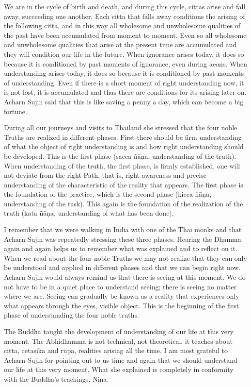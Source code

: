 We are in the cycle of birth and death, and during this cycle, cittas arise and fall away, succeeding one another. Each citta that falls away conditions the arising of the following citta, and in this way all wholesome and unwholesome qualities of the past have been accumulated from moment to moment. Even so all wholesome and unwholesome qualities that arise at the present time are accumulated and they will condition our life in the future. When ignorance arises today, it does so because it is conditioned by past moments of ignorance, even during aeons. When understanding arises today, it does so because it is conditioned by past moments of understanding. Even if there is a short moment of right understanding now, it is not lost, it is accumulated and thus there are conditions for its arising later on. Acharn Sujin said that this is like saving a penny a day, which can become a big fortune.

During all our journeys and visits to Thailand she stressed that the four noble Truths are realized in different phases. First there should be firm understanding of what the object of right understanding is and how right understanding should be developed. This is the first phase (sacca ñāṇa, understanding of the truth). When understanding of the truth, the first phase, is firmly established, one will not deviate from the right Path, that is, right awareness and precise understanding of the characteristic of the reality that appears. The first phase is the foundation of the practice, which is the second phase (kicca ñāṇa, understanding of the task). This again is the foundation of the realization of the truth (kata ñāṇa, understanding of what has been done).

I remember that we were walking in India with one of the Thai monks and that Acharn Sujin was repeatedly stressing these three phases. Hearing the Dhamma again and again helps us to remember what was explained and to reflect on it. When we read about the four noble Truths we may not realize that they can only be understood and applied in different phases and that we can begin right now. Acharn Sujin would always remind us that there is seeing at this moment. We do not have to be in a quiet place to understand seeing; there is seeing no matter where we are. Seeing can gradually be known as a reality that experiences only what appears through the eyes, visible object. This is the beginning of the first phase of understanding the four noble truths.

The Buddha taught the development of understanding of our life at this very moment. The Abhidhamma is not technical, not theoretical, it teaches about citta, cetasika and rūpa, realities arising all the time. I am most grateful to Acharn Sujin for pointing out to us time and again that we should understand our life at this very moment. What she explained is completely in conformity with the Buddha’s teachings.
Nina.
